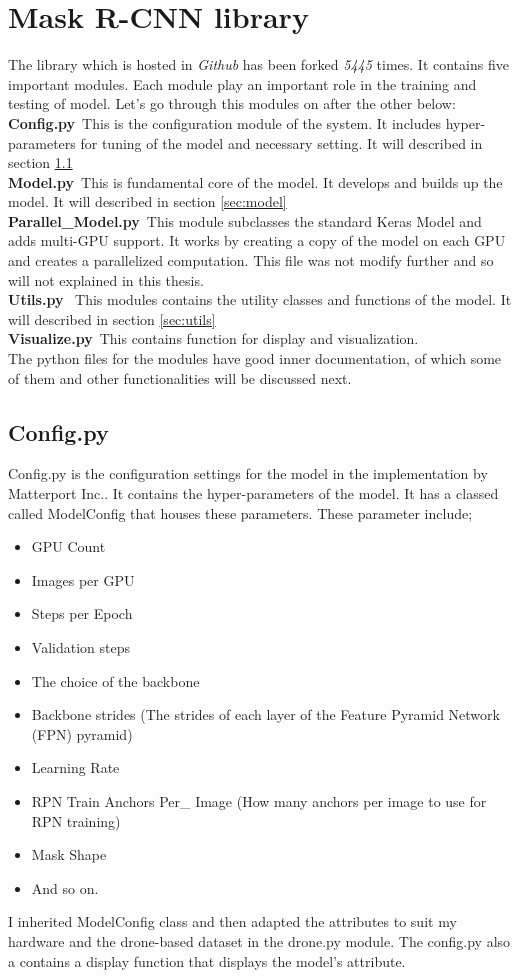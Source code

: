 \section{Mask R-CNN library}
The library which is hosted in \textit{Github} has been forked \textit{5445} times. It contains five important modules. Each module play an important role in the training and testing of model. Let’s go through this modules on after the other below:
\\
\textbf{Config.py}\
This is the configuration module of the system. It includes hyper-parameters for tuning of the model and necessary setting. It will described in section \ref{sec:config}
\\
\textbf{Model.py}\
This is fundamental core of the model. It develops and builds up the model. It will described in section \ref{sec:model}
\\	
\textbf{Parallel\_Model.py}\ 
This module subclasses the standard Keras Model and adds multi-GPU support. It works by creating a copy of the model on each GPU and creates a parallelized computation.
This file was not modify further and so will not explained in this thesis.
\\
\textbf{Utils.py} \
This modules contains the utility classes and functions of the model. It will described in section \ref{sec:utils}
\\
\textbf{Visualize.py}\
This contains function for display and visualization.
\\

The python files for the modules have good inner documentation, of which some of them and other functionalities will be discussed next.

\subsection{Config.py} \label{sec:config}
Config.py is the configuration settings for the model in the implementation by Matterport Inc.. It contains the hyper-parameters of the model. It has a classed called ModelConfig that houses these parameters. These parameter include;
 \begin{itemize}
   \item GPU Count
   \item Images per GPU
   \item Steps per Epoch
   \item Validation steps
   \item The choice of the backbone
   \item Backbone strides (The strides of each layer of the Feature Pyramid Network (FPN) pyramid)
   \item Learning Rate
   \item RPN Train Anchors Per\_ Image (How many anchors per image to use for RPN training)
   \item Mask Shape
   \item And so on.
   
 \end{itemize}
 I inherited ModelConfig  class and then adapted the attributes to suit my hardware and the drone-based dataset in the drone.py module.  The config.py also a contains a display function that displays the model’s attribute.

